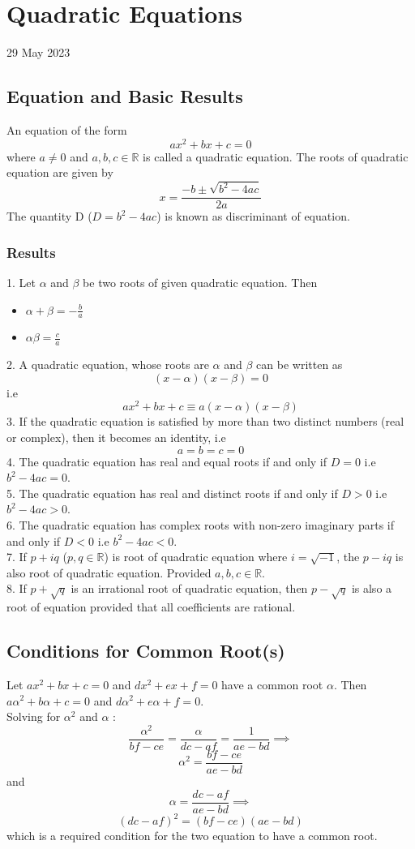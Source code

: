 \documentclass[twocolumn, 10pt]{article}
\begin{document}
\section{Quadratic Equations}
29 May 2023
\subsection{Equation and Basic Results}
An equation of the form $$ax^2+bx+c=0$$ where $a \not= 0$ and $a,b,c \in \mathbb{R}$ is called a quadratic equation. The roots of quadratic equation are given by $$x=\frac{-b \pm \sqrt{b^2-4ac}}{2a}$$ The quantity D ($D=b^2-4ac$) is known as discriminant of equation.
\subsubsection{Results}
1. Let $\alpha$ and $\beta$ be two roots of given quadratic equation. Then

\begin{itemize}
\item $\alpha + \beta = -\frac{b}{a}$
\item $\alpha \beta=\frac{c}{a}$
\end{itemize}
2. A quadratic equation, whose roots are $\alpha$ and $\beta$ can be written as $$(x-\alpha)(x-\beta)=0$$ i.e $$ax^2+bx+c \equiv a(x-\alpha)(x-\beta)$$
3. If the quadratic equation is satisfied by more than two distinct numbers (real or complex), then it becomes an identity, i.e $$a=b=c=0$$
4. The quadratic equation has real and equal roots if and only if $D=0$ i.e $b^2-4ac=0$. \\
5. The quadratic equation has real and distinct roots if and only if $D>0$ i.e $b^2-4ac>0$. \\
6. The quadratic equation has complex roots with non-zero imaginary parts if and only if $D<0$ i.e $b^2-4ac<0$.\\
7. If $p+iq$ ($p,q \in \mathbb{R}$) is root of quadratic equation where $i=\sqrt{-1}$, the $p-iq$ is also root of quadratic equation. Provided $a,b,c \in \mathbb{R}$. \\
8. If $p+\sqrt{q}$ is an irrational root of quadratic equation, then $p-\sqrt{q}$ is also a root of equation provided that all coefficients are rational.
\subsection{Conditions for Common Root(s)}
Let $ax^2+bx+c=0$ and $dx^2+ex+f=0$ have a common root $\alpha$. Then 
$a\alpha ^{2}+b\alpha+c=0$ and $d\alpha ^{2}+e\alpha+f=0$.\\
Solving for $ \alpha^2$ and $ \alpha$ :
$$\frac{\alpha^2}{bf-ce}=\frac{\alpha}{dc-af}=\frac{1}{ae-bd} \implies$$ $$\alpha^2=\frac{bf-ce}{ae-bd}$$ and $$\alpha=\frac{dc-af}{ae-bd} \implies$$ $$(dc-af)^2=(bf-ce)(ae-bd)$$
which is a required condition for the two equation to have a common root.
\end{document}
